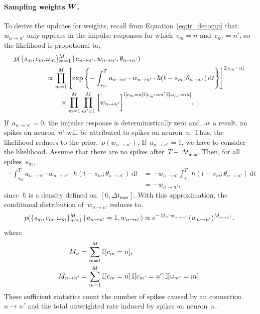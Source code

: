 \paragraph{Sampling weights $\boldsymbol{W}$.} 
To derive the updates for weights, recall from
Equation~\ref{eq:ir_decomp} that~${w_{n \to n'}}$ only
appears in the impulse responses for which~${c_m=n}$
and~${c_{m'}=n'}$, so the likelihood is propotional to,
\begin{align*}
  p(\{s_m, c_m, & \omega_m\}^M_{m=1} \,|\, a_{n \to n'}, w_{n \to n'}, 
  \theta_{n \to n'}) \\
  &\propto \prod_{m=1}^M\left[
    \exp\left\{-\int^T_{s_m} a_{n \to n'} \cdot w_{n \to n'} \cdot \hbar(t - s_m; \theta_{n \to n'}) \, \mathrm{d}t
    \right\} \right]^{\mathbb{I}[c_m=n]} \\
  &\qquad \times \prod_{m=1}^M \prod_{m'=1}^M \bigg[
    w_{n \to n'}\bigg]^{\mathbb{I}[c_{m}=n] \mathbb{I}[c_{m'}=n'] \mathbb{I}[\omega_{m'}=m]}.
\end{align*}
If~${a_{n \to n'}=0}$, the impulse response is deterministically zero
and, as a result, no spikes on neuron~$n'$ will be attributed to spikes
on neuron~$n$. Thus, the likelihood reduces to the prior,~$p(w_{n \to n'})$.
If~${a_{n \to n'}=1}$, we have to consider the likelihood.
Assume that there are no spikes after~${T-\Delta t_{\mathsf{max}}}$. Then,
for all spikes~$s_m$, 
\begin{align*}
  -\int^T_{s_m} a_{n \to n'} \cdot w_{n \to n'} \cdot
  \hbar(t - s_m; \theta_{n \to n'}) \, \mathrm{d}t
  &= -w_{n \to n'}  \int^T_{s_m} \hbar(t - s_m; \theta_{n \to n'}) \, \mathrm{d}t \\
  &= - w_{n \to n'},
\end{align*}
since~$\hbar$ is a density defined on~$[0,\Delta t_{\mathsf{max}}]$.
With this approximation, the conditional distribution of~$w_{n \to n'}$
reduces to,
\begin{align*}
  p(\{s_m,c_m, \omega_m\}^M_{m=1} \,|\, a_{n \to n'}=1, w_{n \to n'}) 
  \propto 
  e^{-M_n \cdot w_{n \to n'}}  \,
  (w_{n \to n'})^{M_{n \to n'}}.
\end{align*}
where
\begin{align*}
  M_{n} &= \sum_{m=1}^M \mathbb{I}[c_{m}=n], \\
  M_{n \to n'} &= \sum_{m=1}^M \mathbb{I}[c_{m}=n] \, \mathbb{I}[c_{m'}=n'] \, \mathbb{I}[\omega_{m'}=m].
\end{align*}
These sufficient statistics count the number of spikes caused
by an connection~${n \to n'}$ and the total unweighted rate induced by
spikes on neuron~$n$.

